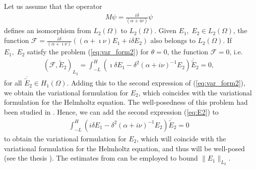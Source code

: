 \begin{remark}
Let us assume that the operator
\begin{align*}
M\psi = \frac{i\delta}{(\alpha+i\nu)}\psi
\end{align*}
defines an isomorphism from $L_{2}(\Omega)$ to $L_{2}(\Omega)$. 
Given $E_1,\; E_2\in L_{2}(\Omega)$, the function $\mathcal{F}=\frac{i\delta}{(\alpha+\imath\nu)}\left((\alpha+\imath\nu)E_{1}+i\delta E_{2}\right)$ also belongs to $L_{2}(\Omega)$. 
If $E_1,\; E_2$ satisfy the problem (\ref{eq:var_form2}) for $\theta=0$, the function $\mathcal{F}=0$, 
i.e.
\begin{align*}
 (\mathcal{F},\tilde{E}_{2})_{L_{2}}=\int_{-L}^{H}\left(\imath\delta E_{1}-\delta^2(\alpha+i\nu)^{-1} E_{2}\right)\overline{\tilde E}_{2}=0,
\end{align*}
for all $\overline{\tilde E}_2\in H_{1}(\Omega)$. Adding this to the second expression of (\ref{eq:var_form2}), we obtain 
the variational formulation for $E_2$, which coincides with the variational formulation for the Helmholtz equation. The well-posedness 
of this problem had been studied in \cite{}. 
Hence, we can add the second expression (\ref{eq:E2}) to
\begin{align*}
\int_{-L}^{H}\left(i\delta E_{1}-\delta^2(\alpha+i\nu)^{-1} E_{2}\right)\overline{\tilde E}_{2}=0
\end{align*}
to obtain the variational formulation for $E_{2}$, which will coincide with the variational formulation for the Helmholtz equation, and thus will be well-posed 
(see the thesis \cite{thesis_lmig}).
The estimates from \cite{thesis_lmig} can be employed to bound $\|E_{1}\|_{L_{2}}$.
\end{remark}


